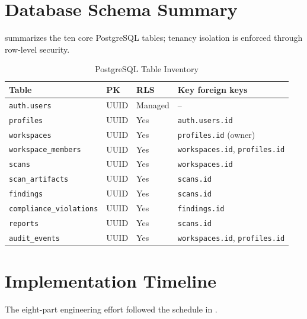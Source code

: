 \documentclass[conference]{IEEEtran}
\newcommand{\tsz}{\footnotesize}
\begin{document}
\section{Database Schema Summary}
\label{app:schema}
 summarizes the ten core PostgreSQL tables; tenancy isolation is
enforced through row-level security.

\begin{table}[!t]
\caption{PostgreSQL Table Inventory}
\label{tab:schema}
\centering\tsz
\begin{tabularx}{\columnwidth}{@{}lllX@{}}
\toprule
\textbf{Table} & \textbf{PK} & \textbf{RLS} & \textbf{Key foreign keys}\\
\midrule
\texttt{auth.users}            & UUID & Managed & --\\
\texttt{profiles}              & UUID & Yes & \texttt{auth.users.id}\\
\texttt{workspaces}            & UUID & Yes & \texttt{profiles.id} (owner)\\
\texttt{workspace\_members}    & UUID & Yes & \texttt{workspaces.id}, \texttt{profiles.id}\\
\texttt{scans}                 & UUID & Yes & \texttt{workspaces.id}\\
\texttt{scan\_artifacts}       & UUID & Yes & \texttt{scans.id}\\
\texttt{findings}              & UUID & Yes & \texttt{scans.id}\\
\texttt{compliance\_violations} & UUID & Yes & \texttt{findings.id}\\
\texttt{reports}               & UUID & Yes & \texttt{scans.id}\\
\texttt{audit\_events}         & UUID & Yes & \texttt{workspaces.id}, \texttt{profiles.id}\\
\bottomrule
\end{tabularx}
\end{table}

\section{Implementation Timeline}
\label{app:timeline_ref}
The eight-part engineering effort followed the schedule in .
\end{document}

